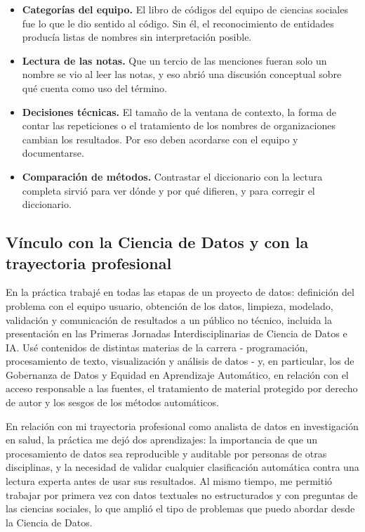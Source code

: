 \documentclass[11pt,a4paper]{article}
\begin{document}
\begin{itemize}
  \item \textbf{Categorías del equipo.} El libro de códigos del equipo de ciencias sociales fue lo que le dio sentido al código. Sin él, el reconocimiento de entidades producía listas de nombres sin interpretación posible.
  \item \textbf{Lectura de las notas.} Que un tercio de las menciones fueran solo un nombre se vio al leer las notas, y eso abrió una discusión conceptual sobre qué cuenta como uso del término.
  \item \textbf{Decisiones técnicas.} El tamaño de la ventana de contexto, la forma de contar las repeticiones o el tratamiento de los nombres de organizaciones cambian los resultados. Por eso deben acordarse con el equipo y documentarse.
  \item \textbf{Comparación de métodos.} Contrastar el diccionario con la lectura completa sirvió para ver dónde y por qué difieren, y para corregir el diccionario.
\end{itemize}

\subsection{Vínculo con la Ciencia de Datos y con la trayectoria profesional}

En la práctica trabajé en todas las etapas de un proyecto de datos: definición del problema con el equipo usuario, obtención de los datos, limpieza, modelado, validación y comunicación de resultados a un público no técnico, incluida la presentación en las Primeras Jornadas Interdisciplinarias de Ciencia de Datos e IA. Usé contenidos de distintas materias de la carrera - programación, procesamiento de texto, visualización y análisis de datos - y, en particular, los de Gobernanza de Datos y Equidad en Aprendizaje Automático, en relación con el acceso responsable a las fuentes, el tratamiento de material protegido por derecho de autor y los sesgos de los métodos automáticos.

En relación con mi trayectoria profesional como analista de datos en investigación en salud, la práctica me dejó dos aprendizajes: la importancia de que un procesamiento de datos sea reproducible y auditable por personas de otras disciplinas, y la necesidad de validar cualquier clasificación automática contra una lectura experta antes de usar sus resultados. Al mismo tiempo, me permitió trabajar por primera vez con datos textuales no estructurados y con preguntas de las ciencias sociales, lo que amplió el tipo de problemas que puedo abordar desde la Ciencia de Datos.
\end{document}
